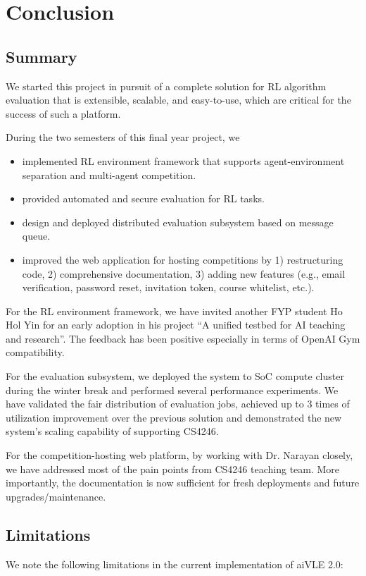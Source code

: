 \chapter{Conclusion}
\label{ch:conclusion}

\section{Summary}
\label{s:conclusion-summary}
We started this project in pursuit of a complete solution for RL algorithm evaluation that is extensible, scalable, and easy-to-use, which are critical for the success of such a platform.

During the two semesters of this final year project, we
\begin{itemize}
    \item implemented RL environment framework that supports agent-environment separation and multi-agent competition.
    \item provided automated and secure evaluation for RL tasks.
    \item design and deployed distributed evaluation subsystem based on message queue.
    \item improved the web application for hosting competitions by 1) restructuring code, 2) comprehensive documentation, 3) adding new features (e.g., email verification, password reset, invitation token, course whitelist, etc.).
\end{itemize}

For the RL environment framework, we have invited another FYP student Ho Hol Yin for an early adoption in his project ``A unified testbed for AI teaching and research''. The feedback has been positive especially in terms of OpenAI Gym compatibility.

For the evaluation subsystem, we deployed the system to SoC compute cluster during the winter break and performed several performance experiments. We have validated the fair distribution of evaluation jobs, achieved up to 3 times of utilization improvement over the previous solution and demonstrated the new system’s scaling capability of supporting CS4246.

For the competition-hosting web platform, by working with Dr. Narayan closely, we have addressed most of the pain points from CS4246 teaching team. More importantly, the documentation is now sufficient for fresh deployments and future upgrades/maintenance.

\section{Limitations}
\label{s:conclusion-limitations}
We note the following limitations in the current implementation of aiVLE 2.0:

